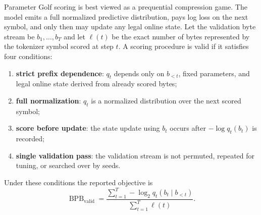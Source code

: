 \documentclass[11pt]{article}
\theoremstyle{definition}
\theoremstyle{plain}
\theoremstyle{remark}
\numberwithin{equation}{section}
\begin{document}
Parameter Golf scoring is best viewed as a prequential compression game.  The model emits a full normalized predictive distribution, pays log loss on the next symbol, and only then may update any legal online state.  Let the validation byte stream be $b_1,\dots,b_T$ and let $\ell(t)$ be the exact number of bytes represented by the tokenizer symbol scored at step $t$.  A scoring procedure is valid if it satisfies four conditions:
\begin{enumerate}[leftmargin=2em]
  \item \textbf{strict prefix dependence}: $q_t$ depends only on $b_{<t}$, fixed parameters, and legal online state derived from already scored bytes;
  \item \textbf{full normalization}: $q_t$ is a normalized distribution over the next scored symbol;
  \item \textbf{score before update}: the state update using $b_t$ occurs after $-\log q_t(b_t)$ is recorded;
  \item \textbf{single validation pass}: the validation stream is not permuted, repeated for tuning, or searched over by seeds.
\end{enumerate}
Under these conditions the reported objective is
\begin{equation}
  \operatorname{BPB}_{\mathrm{valid}}
  =\frac{\sum_{t=1}^{T}-\log_2 q_t(b_t\mid b_{<t})}{\sum_{t=1}^{T}\ell(t)}.
\end{equation}
\end{document}
